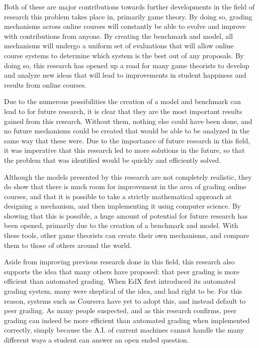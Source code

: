 \documentclass[12pt, Arial]{article}
\begin{document}
Both of these are major contributions towards further developments in the field of research this problem takes place in, primarily game theory. By doing so, grading mechanisms across online courses will constantly be able to evolve and improve with contributions from anyone. By creating the benchmark and model, all mechanisms will undergo a uniform set of evaluations that will allow online course systems to determine which system is the best out of any proposals. By doing so, this research has opened up a road for many game theorists to develop and analyze new ideas that will lead to improvements in student happiness and results from online courses.

Due to the numerous possibilities the creation of a model and benchmark can lead to for future research, it is clear that they are the most important results gained from this research. Without them, nothing else could have been done, and no future mechanisms could be created that would be able to be analyzed in the same way that these were. Due to the importance of future research in this field, it was imperative that this research led to more solutions in the future, so that the problem that was identified would be quickly and efficiently solved.

Although the models presented by this research are not completely realistic, they do show that there is much room for improvement in the area of grading online courses, and that it is possible to take a strictly mathematical approach at designing a mechanism, and then implementing it using computer science. By showing that this is possible, a huge amount of potential for future research has been opened, primarily due to the creation of a benchmark and model. With these tools, other game theorists can create their own mechanisms, and compare them to those of others around the world.

Aside from improving previous research done in this field, this research also supports the idea that many others have proposed: that peer grading is more efficient than automated grading. When EdX first introduced its automated grading system, many were skeptical of the idea, and had right to be. For this reason, systems such as Coursera have yet to adopt this, and instead default to peer grading. As many people suspected, and as this research confirms, peer grading can indeed be more efficient than automated grading when implemented correctly, simply because the A.I. of current machines cannot handle the many different ways a student can answer an open ended question.
\end{document}
